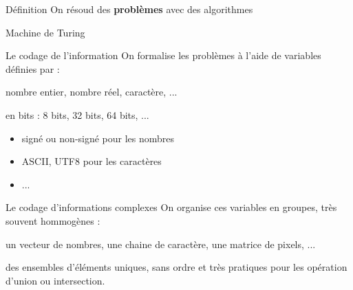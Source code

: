 \begin{frame}{Définition}
    On résoud des \textbf{problèmes} avec des algorithmes
\end{frame}

\begin{frame}{Machine de Turing}
\end{frame}

\begin{frame}{Le codage de l'information}
    On formalise les problèmes à l'aide de variables définies par :
    \begin{description}[<+->]
        \item [Le TYPE] nombre entier, nombre réel, caractère, ...
        \item [La TAILLE] en bits : 8 bits, 32 bits, 64 bits, ...
        \item [Le CODAGE] 
        \begin{itemize}
            \item signé ou non-signé pour les nombres
            \item ASCII, UTF8 pour les caractères
            \item ...
        \end{itemize}
    \end{description}
\end{frame}

\begin{frame}{Le codage d'informations complexes}
    On organise ces variables en groupes, très souvent hommogènes :
    \begin{description}[<+->]
        \item [Les LISTES] un vecteur de nombres, une chaine de caractère, une matrice de pixels, ...
        \item [Les COLLECTIONS] des ensembles d'éléments uniques, sans ordre et très pratiques pour les opération d'union ou intersection.
        \item [ETC ...]
    \end{description}
\end{frame}
